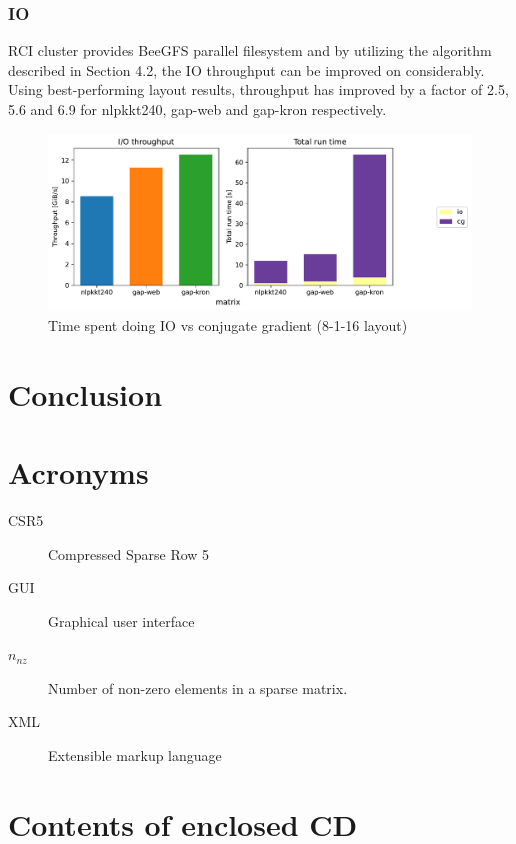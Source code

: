 \documentclass[thesis=M,english]{FITthesis}[2019/12/23]
\begin{document}
\subsection{IO}

RCI cluster provides BeeGFS parallel filesystem and by utilizing the algorithm described in
Section 4.2, the IO throughput can be improved on considerably. Using best-performing 
layout results, throughput has improved by a factor of 2.5, 5.6 and 6.9 for nlpkkt240, gap-web
and gap-kron respectively.

\begin{figure}[htp]
    \centering
    \includegraphics[scale=0.5]{static/io_mp.pdf}
    \caption{Time spent doing IO vs conjugate gradient (8-1-16 layout)}
\end{figure}







\chapter{Conclusion}





\appendix

\chapter{Acronyms}
\begin{description}
    \item[CSR5] Compressed Sparse Row 5
    \item[GUI] Graphical user interface
    \item[$n_{nz}$] Number of non-zero elements in a sparse matrix.
    \item[XML] Extensible markup language
\end{description}


\chapter{Contents of enclosed CD}

\end{document}
